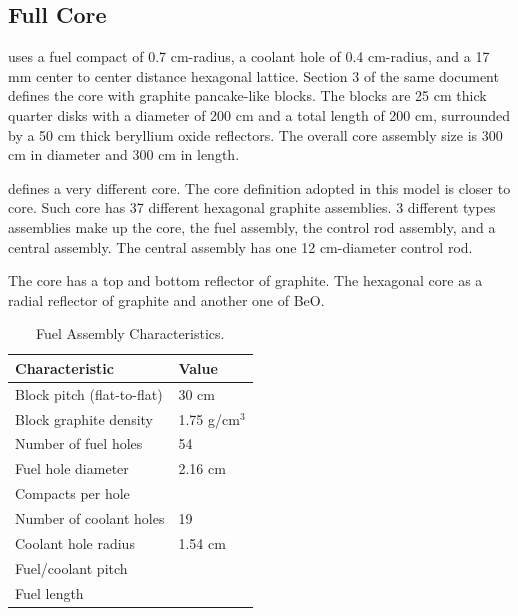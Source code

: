 \documentclass[11pt,letterpaper]{article}
\begin{document}
\subsection{Full Core}

\cite{venneri_neutronic_2015} uses a fuel compact of 0.7 cm-radius, a coolant hole of 0.4 cm-radius, and a 17 mm center to center distance hexagonal lattice.
Section 3 of the same document defines the core with graphite pancake-like blocks.
The blocks are 25 cm thick quarter disks with a diameter of 200 cm and a total length of 200 cm, surrounded by a 50 cm thick beryllium oxide reflectors.
The overall core assembly size is 300 cm in diameter and 300 cm in length.

\cite{hawari_development_2018} defines a very different core.
The core definition adopted in this model is closer to \cite{hawari_development_2018} core.
Such core has 37 different hexagonal graphite assemblies.
3 different types assemblies make up the core, the fuel assembly, the control rod assembly, and a central assembly.
The central assembly has one 12 cm-diameter control rod.


The core has a top and bottom reflector of graphite.
The hexagonal core as a radial reflector of graphite and another one of BeO.

	\begin{table}[]
		\centering
	    \caption{Fuel Assembly Characteristics.}
	    \label{tab:compact}
		\begin{tabular}{l|l}
		\hline
		Characteristic                   & Value         \\ \hline
		Block pitch (flat-to-flat)       & 30 cm         \\
		Block graphite density           & 1.75 g/cm$^3$ \\
		Number of fuel holes             & 54            \\
		Fuel hole diameter               & 2.16 cm       \\
		Compacts per hole                &               \\
		Number of coolant holes          & 19            \\
		Coolant hole radius        		 & 1.54 cm       \\

		Fuel/coolant pitch               &               \\
		Fuel length                      &               \\ \hline

		\end{tabular}
	\end{table}
\end{document}
